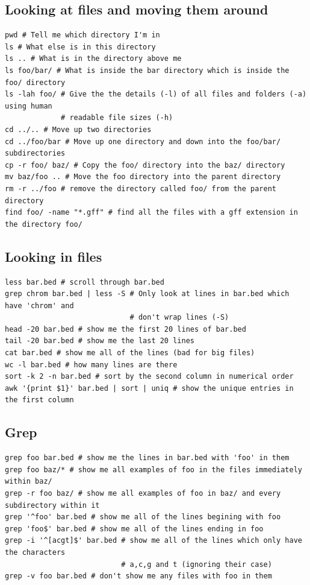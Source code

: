 \documentclass[11pt]{article}
\begin{document}
\hypertarget{looking-at-files-and-moving-them-around}{%
\subsection{Looking at files and moving them
around}\label{looking-at-files-and-moving-them-around}}

\begin{verbatim}
pwd # Tell me which directory I'm in
ls # What else is in this directory
ls .. # What is in the directory above me
ls foo/bar/ # What is inside the bar directory which is inside the foo/ directory
ls -lah foo/ # Give the the details (-l) of all files and folders (-a) using human
             # readable file sizes (-h)
cd ../.. # Move up two directories
cd ../foo/bar # Move up one directory and down into the foo/bar/ subdirectories
cp -r foo/ baz/ # Copy the foo/ directory into the baz/ directory
mv baz/foo .. # Move the foo directory into the parent directory
rm -r ../foo # remove the directory called foo/ from the parent directory
find foo/ -name "*.gff" # find all the files with a gff extension in the directory foo/
\end{verbatim}

\hypertarget{looking-in-files}{%
\subsection{Looking in files}\label{looking-in-files}}

\begin{verbatim}
less bar.bed # scroll through bar.bed
grep chrom bar.bed | less -S # Only look at lines in bar.bed which have 'chrom' and
                             # don't wrap lines (-S)
head -20 bar.bed # show me the first 20 lines of bar.bed
tail -20 bar.bed # show me the last 20 lines
cat bar.bed # show me all of the lines (bad for big files)
wc -l bar.bed # how many lines are there
sort -k 2 -n bar.bed # sort by the second column in numerical order
awk '{print $1}' bar.bed | sort | uniq # show the unique entries in the first column
\end{verbatim}

\hypertarget{grep}{%
\subsection{Grep}\label{grep}}

\begin{verbatim}
grep foo bar.bed # show me the lines in bar.bed with 'foo' in them
grep foo baz/* # show me all examples of foo in the files immediately within baz/
grep -r foo baz/ # show me all examples of foo in baz/ and every subdirectory within it
grep '^foo' bar.bed # show me all of the lines begining with foo
grep 'foo$' bar.bed # show me all of the lines ending in foo
grep -i '^[acgt]$' bar.bed # show me all of the lines which only have the characters
                           # a,c,g and t (ignoring their case)
grep -v foo bar.bed # don't show me any files with foo in them
\end{verbatim}
\end{document}
